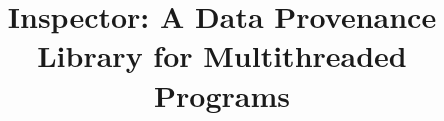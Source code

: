 \documentclass[letterpaper,twocolumn,10pt]{article}
\begin{document}
\title{Inspector: A Data Provenance Library for Multithreaded Programs}



\maketitle
\thispagestyle{empty}




%










 
\end{document}
